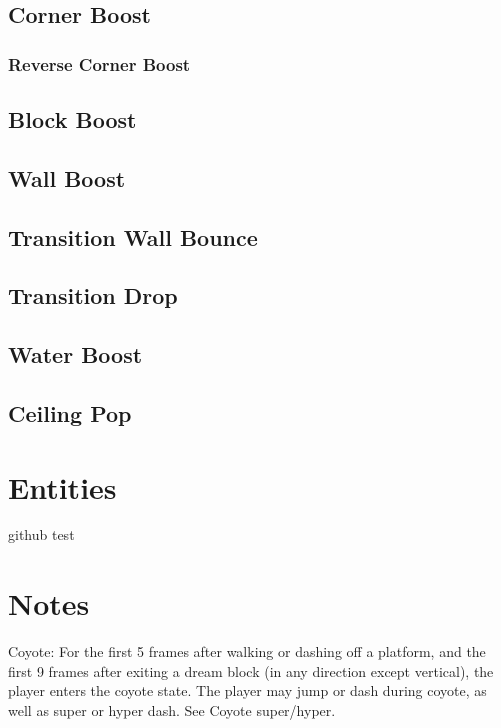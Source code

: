 \documentclass[oneside]{book}
\begin{document}
\section{Corner Boost}

\subsection{Reverse Corner Boost}

\section{Block Boost}

\section{Wall Boost}

\section{Transition Wall Bounce}

\section{Transition Drop}

\section{Water Boost}

\section{Ceiling Pop}

\chapter{Entities}

github test

\chapter{Notes}



Coyote:
For the first 5 frames after walking or dashing off a platform, and the first 9 frames after exiting a dream block (in any direction except vertical), the player enters the coyote state. The player may jump or dash during coyote, as well as super or hyper dash. See Coyote super/hyper.
\end{document}
